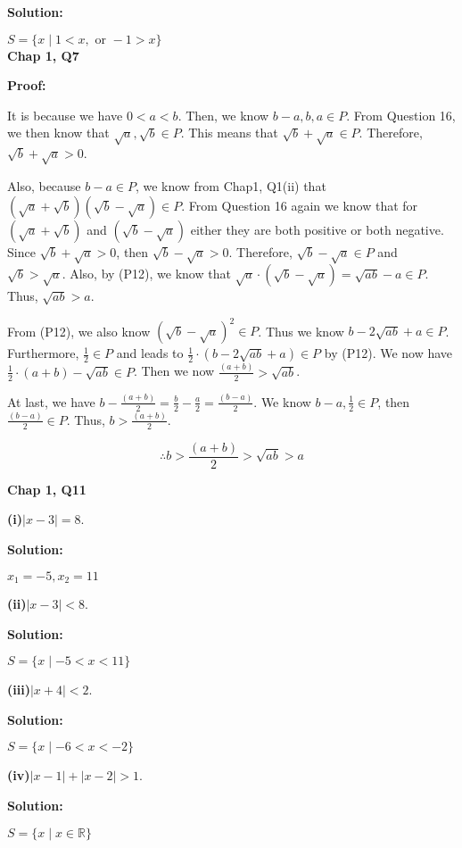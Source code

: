 \documentclass[a4paper,12pt]{report}
\begin{document}
\noindent
\textbf{Solution:}

\noindent
$S=\{x \mid 1<x, \text{ or }-1>x\}$\\

\noindent
\textbf{Chap 1, Q7}

\noindent
\textbf{Proof: }

It is because we have $0<a<b$. Then, we know $b-a,b,a\in P$. From Question 16, we then know that $\sqrt{a},\sqrt{b}\in P$. This means that $\sqrt{b} + \sqrt{a}\in P$. Therefore, $\sqrt{b} + \sqrt{a}>0$.

Also, because $b-a \in P$, we know from Chap1, Q1(ii) that $(\sqrt{a}+\sqrt{b})(\sqrt{b}-\sqrt{a}) \in P$. From Question 16 again we know that for $(\sqrt{a}+\sqrt{b})$ and $(\sqrt{b}-\sqrt{a})$ either they are both positive or both negative. Since $\sqrt{b} + \sqrt{a}>0$, then $\sqrt{b}-\sqrt{a}>0$. Therefore, $\sqrt{b}-\sqrt{a}\in P$ and $\sqrt{b}>\sqrt{a}$. Also, by (P12), we know that $\sqrt{a}\cdot{(\sqrt{b}-\sqrt{a})} = \sqrt{ab}- a\in P$. Thus, $\sqrt{ab}>a$.

From (P12), we also know $(\sqrt{b}-\sqrt{a})^{2}\in P$. Thus we know $b-2\sqrt{ab}+a\in P$. Furthermore, $\frac{1}{2}\in P$ and leads to $\frac{1}{2}\cdot{(b-2\sqrt{ab}+a)}\in P$ by (P12). We now have $\frac{1}{2}\cdot{(a+b)}-\sqrt{ab}\in P$. Then we now $\frac{(a+b)}{2}>\sqrt{ab}$.

At last, we have $b-\frac{(a+b)}{2}=\frac{b}{2}-\frac{a}{2}=\frac{(b-a)}{2}$. We know $b-a,\frac{1}{2} \in P$, then $\frac{(b-a)}{2}\in P$. Thus, $b>\frac{(a+b)}{2}$.

\[\therefore b>\frac{(a+b)}{2}>\sqrt{ab}>a\]

\noindent
\textbf{Chap 1, Q11}

\noindent
\textbf{(i)}$|x-3|=8$.

\noindent
\textbf{Solution:}

\noindent
$x_1=-5,x_2=11$

\noindent
\textbf{(ii)}$|x-3|<8$.

\noindent
\textbf{Solution:}

\noindent
$S=\{x \mid -5<x<11\}$

\noindent
\textbf{(iii)}$|x+4|<2$.

\noindent
\textbf{Solution:}

\noindent
$S=\{x \mid -6<x<-2\}$

\noindent
\textbf{(iv)}$|x-1| + |x-2|>1$.

\noindent
\textbf{Solution:}

\noindent
$S=\{x \mid x \in \mathbb{R}\}$
\end{document}

